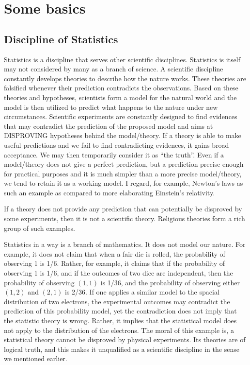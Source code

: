 \chapter{Some basics}

\section{Discipline of Statistics}
Statistics is a discipline that serves
other scientific disciplines. Statistics is itself
may not considered by many as a branch of science. 
A scientific discipline constantly develops theories to
describe how the nature works. 
These theories are falsified whenever their
prediction contradicts the observations.
Based on these theories and hypotheses, 
scientists form a model for the natural
world and the model is then utilized to predict what
happens to the nature under new circumstances.
Scientific experiments are constantly designed to
find evidences that may contradict the
prediction of the proposed model
and aims at DISPROVING hypotheses behind the model/theory.
If a theory is able to make useful predictions
and we fail to find contradicting evidences,
it gains broad acceptance.
We may then temporarily consider it as ``the truth''.
Even if a model/theory does not give a perfect prediction,
but a prediction precise enough for practical purposes
and it is much simpler than a more precise model/theory,
we tend to retain it as a working model.
I regard, for example, Newton's laws as such an example
as compared to more elaborating Einstein's relativity.

If a theory does not provide any prediction that can potentially be
disproved by some experiments, then it is not a scientific theory.
Religious theories form a rich group of such examples.

Statistics in a way is a branch of mathematics. It does not
model our nature. For example, it does not claim that when
a fair die is rolled, the probability of observing 1 is 1/6.
Rather, for example, it claims that if the probability of observing 1
is 1/6, and if the outcomes of two dice are independent,
then the probability of observing $(1, 1)$ is 1/36,
and the probability of observing either $(1, 2)$ and $(2, 1)$ is 2/36.
If one applies a similar model to the spacial distribution of two electrons,
the experimental outcomes may contradict the prediction
of this probability model, yet the contradiction does not imply that the
statistic theory is wrong. Rather, it implies that the statistical model
does not apply to the distribution of the electrons.
The moral of this example is, a statistical theory cannot be 
disproved by physical experiments. 
Its theories are of logical truth, and this makes it unqualified
as a scientific discipline in the sense we mentioned earlier.

